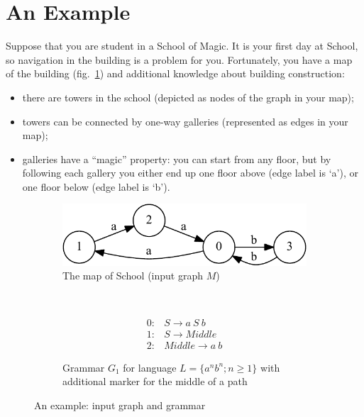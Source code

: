 \section{An Example}\label{motivExample}

Suppose that you are student in a School of Magic.
It is your first day at School, so navigation in the building is a problem for you.
Fortunately, you have a map of the building (fig.~\ref{input}) and additional knowledge about building construction:
\begin{itemize}
  \item there are towers in the school (depicted as nodes of the graph in your map);
  \item towers can be connected by one-way galleries (represented as edges in your map);
  \item galleries have a ``magic'' property: you can start from any floor, but by following each gallery you either end up one floor above (edge label is `a'), or one floor below (edge label is `b'). 
\end{itemize}

\begin{figure}[h]
    \begin{center}
	\centering
    \begin{subfigure}[b]{0.45\textwidth}
        \includegraphics[width=\textwidth]{dot/input.pdf}
        \caption{The map of School (input graph $M$)}
        \label{input}        
		\vspace{1cm}
	\end{subfigure}
	~	
	\begin{subfigure}[b]{0.45\textwidth}
   \[
\begin{array}{rl}
   0:& S \rightarrow a \ S \ b \\
   1:& S \rightarrow Middle \\
   2:& Middle \rightarrow a \ b
\end{array}
\]
   \caption{Grammar $G_1$ for language $L=\{a^n b^n; n \geq 1\}$ with additional marker for the middle of a path}
   \label{grammarG}        
	\end{subfigure}
    \end{center}
\label{exampleData}
\caption{An example: input graph and grammar}
\end{figure}



